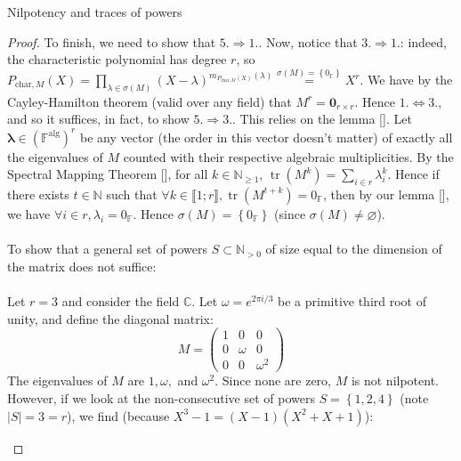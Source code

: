 \begin{appendixitem}{Nilpotency and traces of powers}
\begin{proof}
        To finish, we need to show that \( 5. \Rightarrow 1. \). Now, notice that \( 3. \Rightarrow 1. \): indeed, the characteristic polynomial has degree \( r \), so \( P_{\text{char}, M}\left(X\right) = \prod_{\lambda \in \sigma\left(M\right)} \left(X - \lambda\right)^{m_{P_{\text{char}, M}\left(X\right)}\left(\lambda\right)} \overset{\sigma\left(M\right)=\left\{0_{\mathbb{F}}\right\}}{=} X^r \). We have by the Cayley-Hamilton theorem (valid over any field) that \( M^r = \mathbf{0}_{r \times r} \). Hence \( 1.\Leftrightarrow 3. \), and so it suffices, in fact, to show \( 5.\Rightarrow 3. \). This relies on the lemma []. Let \( \boldsymbol{\lambda} \in \left(\mathbb{F}^{\text{alg}}\right)^r \) be any vector (the order in this vector doesn't matter) of exactly all the eigenvalues of \( M \) counted with their respective algebraic multiplicities. By the Spectral Mapping Theorem [], for all \( k \in \mathbb{N}_{\geq 1} \), \( \operatorname{tr}\left(M^k\right) = \sum_{i \in r} \lambda_i^k \). Hence if there exists \( t \in \mathbb{N} \) such that \( \forall k \in \llbracket 1;r \rrbracket, \operatorname{tr}\left(M^{t+k}\right) = 0_{\mathbb{F}} \), then by our lemma [], we have \( \forall i \in r, \lambda_i = 0_{\mathbb{F}} \). Hence \( \sigma\left(M\right) = \left\{0_{\mathbb{F}}\right\} \) (since \( \sigma\left(M\right) \neq \varnothing \)).
        \\\\
        To show that a general set of powers \( S \subset \mathbb{N}_{>0} \) of size equal to the dimension of the matrix does not suffice:
        \\\\
        Let \( r=3 \) and consider the field \( \mathbb{C} \). Let \( \omega = e^{2\pi i / 3} \) be a primitive third root of unity, and define the diagonal matrix:
        \[
            M = \begin{pmatrix} 1 & 0 & 0 \\ 0 & \omega & 0 \\ 0 & 0 & \omega^2 \end{pmatrix}
        \]
        The eigenvalues of \( M \) are \( 1, \omega, \) and \( \omega^2 \). Since none are zero, \( M \) is not nilpotent. However, if we look at the non-consecutive set of powers \( S = \left\{1, 2, 4\right\} \) (note \( \left|S\right| = 3 = r \)), we find (because \( X^3-1 = \left(X-1\right)\left(X^2+ X + 1\right) \)):
        \begin{itemize}

\end{itemize}
\end{proof}
\end{appendixitem}
